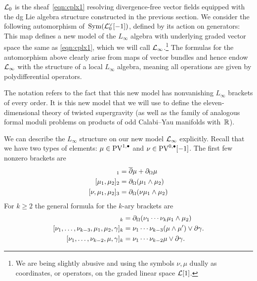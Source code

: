 $\mathcal L_0$ is the sheaf~\eqref{eqn:cplx1} resolving divergence-free vector fields equipped with the dg Lie algebra structure constructed in the previous section.
We consider the following automorphism of~$\operatorname{Sym}(\mathcal L_0^\vee[-1])$, defined by its action on generators:
This map defines a new model of the $L_\infty$ algebra with underlying graded vector space the same as \eqref{eqn:cplx1}, which we will call $\mathcal L_\infty$.\footnote{We are being slightly abusive and using the symbols $\nu,\mu$ dually as coordinates, or operators, on the graded linear space $\mathcal L[1]$.}
The formulas for the automorphism above clearly arise from maps of vector bundles and hence endow $\mathcal L_\infty$ with the structure of a local $L_\infty$ algebra, meaning all operations are given by polydifferential operators.  

The notation refers to the fact that this new model has nonvanishing $L_\infty$ brackets of every order. 
It is this new model that we will use to define the eleven-dimensional theory of twisted supergravity (as well as the family of analogous formal moduli problems on products of odd Calabi--Yau manifolds with~$\mathbb{R}$). 



We can describe the $L_\infty$ structure on our new model $\mathcal L_\infty$ explicitly.
Recall that we have two types of elements: $\mu \in {\rm PV}^{1,\bullet}$ and $\nu \in {\rm PV}^{0,\bullet}[-1]$. 
The first few nonzero brackets are
\begin{align*}
[\mu]_1 & = \dbar \mu + \div \mu \\
[\mu_1,\mu_2]_2 & = \div (\mu_1 \wedge \mu_2) \\
[\nu, \mu_1,\mu_2]_3 & = \div(\nu \mu_1 \wedge \mu_2) 
\end{align*}
For $k \geq 2$ the general formula for the $k$-ary brackets are 
\begin{align*}
[\nu_1, \ldots, \nu_{k-2}, \mu_1,\mu_2]_{k} & = \div(\nu_1 \cdots \nu_k \mu_1 \wedge \mu_2) \\
[\nu_1,\ldots, \nu_{k-3}, \mu_1,\mu_2,\gamma]_k & = \nu_1 \cdots \nu_{k-3} (\mu \wedge \mu') \vee \del \gamma .\\
[\nu_1,\ldots,\nu_{k-2}, \mu, \gamma]_k & = \nu_1 \cdots \nu_{k-2} \mu \vee \del \gamma .
\end{align*}

